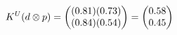 \documentclass[preview]{standalone}
\begin{document}
\begin{align*}
\special{dvisvgm:raw <g id='unique000'>}K^U(d \otimes p) = \begin{pmatrix} (0.81)(0.73) \\ (0.84)(0.54) \end{pmatrix} = \begin{pmatrix} 0.58 \\ 0.45 \end{pmatrix}\special{dvisvgm:raw </g>}
\end{align*}
\end{document}
